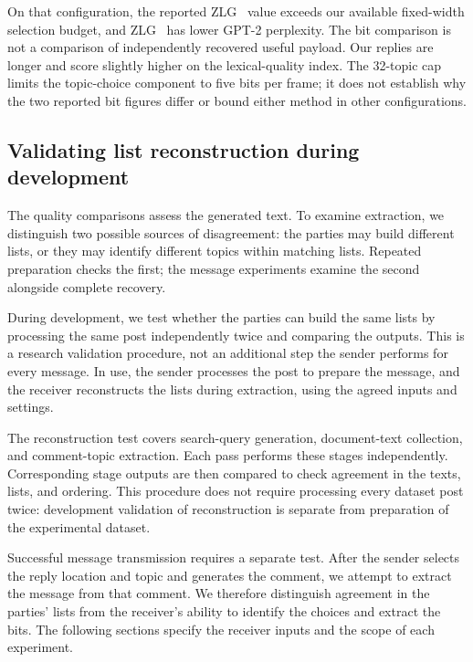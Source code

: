 On that configuration, the reported ZLG~\cite{lin2024zero} value exceeds our available fixed-width selection budget, and ZLG~\cite{lin2024zero} has lower GPT-2 perplexity. The bit comparison is not a comparison of independently recovered useful payload.
Our replies are longer and score slightly higher on the lexical-quality index.
The 32-topic cap limits the topic-choice component to five bits per frame; it does not establish why the two reported bit figures differ or bound either method in other configurations.

\subsection{Validating list reconstruction during development}
\label{sec:reconstruction-validation}

The quality comparisons assess the generated text. To examine extraction, we distinguish two possible sources of disagreement: the parties may build different lists, or they may identify different topics within matching lists. Repeated preparation checks the first; the message experiments examine the second alongside complete recovery.

During development, we test whether the parties can build the same lists by processing the same post independently twice and comparing the outputs. This is a research validation procedure, not an additional step the sender performs for every message. In use, the sender processes the post to prepare the message, and the receiver reconstructs the lists during extraction, using the agreed inputs and settings.

The reconstruction test covers search-query generation, document-text collection, and comment-topic extraction. Each pass performs these stages independently. Corresponding stage outputs are then compared to check agreement in the texts, lists, and ordering. This procedure does not require processing every dataset post twice: development validation of reconstruction is separate from preparation of the experimental dataset.

Successful message transmission requires a separate test. After the sender selects the reply location and topic and generates the comment, we attempt to extract the message from that comment. We therefore distinguish agreement in the parties' lists from the receiver's ability to identify the choices and extract the bits. The following sections specify the receiver inputs and the scope of each experiment.

